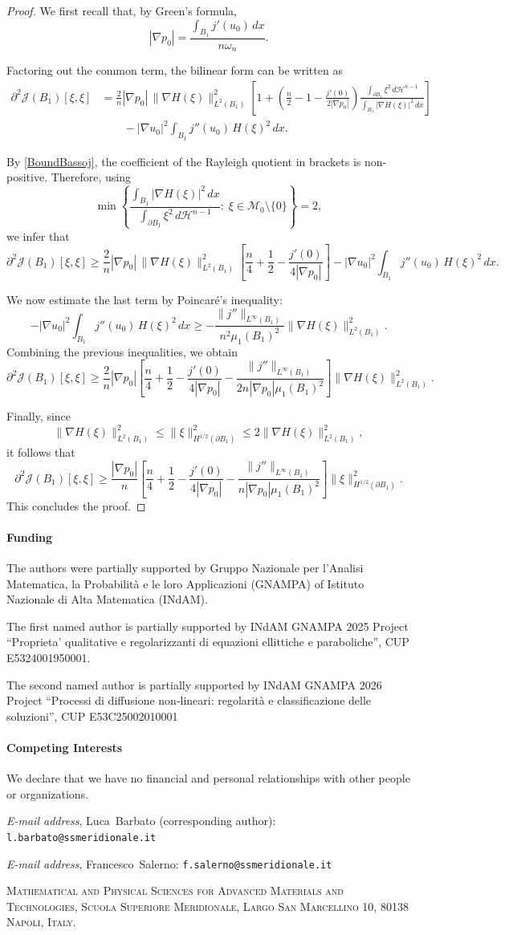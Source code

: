 \documentclass[oneside,a4paper,11pt,notitlepage]{article}
\makeatletter
\theoremstyle{definition}
\theoremstyle{plain}
\theoremstyle{definition}
\newcommand{\Addresses}{{%
\bigskip 
  \footnotesize 
\noindent \textit{E-mail address}, Luca~Barbato (corresponding author): \texttt{l.barbato@ssmeridionale.it} 

     \medskip 

 \noindent \textit{E-mail address}, Francesco~Salerno: \texttt{f.salerno@ssmeridionale.it}

  
   \medskip 
 
  \textsc{Mathematical and Physical Sciences for Advanced Materials and Technologies, Scuola Superiore Meridionale, Largo San Marcellino 10, 80138 Napoli, Italy. } 
 
 
 \par\nopagebreak 

}}
\makeatother
\begin{document}
\begin{proof}
We first recall that, by Green's formula,
\[
|\nabla p_0|=\frac{\int_{B_1} j'(u_0)\,dx}{n\omega_n}.
\]

Factoring out the common term, the bilinear form can be written as
\[
\begin{aligned}
\partial^2\mathcal{J}(B_1)[\xi,\xi]&=\frac{2}{n}|\nabla p_0|\,\|\nabla H(\xi)\|_{L^2(B_1)}^2\left[1+\left(\frac n2-1-\frac{j'(0)}{2|\nabla p_0|}\right)\frac{\int_{\partial B_1}\xi^2\,d\mathcal H^{n-1}}{\int_{B_1}|\nabla H(\xi)|^2\,dx}\right] \\&\qquad-|\nabla u_0|^2\int_{B_1} j''(u_0)\,H(\xi)^2\,dx.
\end{aligned}
\]

By \eqref{BoundBassoj}, the coefficient of the Rayleigh quotient in brackets is non-positive. Therefore, using
\[
\min\left\{\frac{\int_{B_1}|\nabla H(\xi)|^2\,dx}{\int_{\partial B_1}\xi^2\,d\mathcal H^{n-1}}:\;\xi\in\mathcal M_0\setminus\{0\}\right\}=2,
\]
we infer that
\[
\partial^2\mathcal{J}(B_1)[\xi,\xi]\geq\frac{2}{n}|\nabla p_0|\,\|\nabla H(\xi)\|_{L^2(B_1)}^2\left[\frac n4+\frac12-\frac{j'(0)}{4|\nabla p_0|}\right]-|\nabla u_0|^2\int_{B_1} j''(u_0)\,H(\xi)^2\,dx.
\]

We now estimate the last term by Poincar\'e's inequality:
\[
-|\nabla u_0|^2\int_{B_1} j''(u_0)\,H(\xi)^2\,dx\geq-\frac{\|j''\|_{L^\infty(B_1)}}{n^2\mu_1(B_1)^2}\|\nabla H(\xi)\|_{L^2(B_1)}^2.
\]
Combining the previous inequalities, we obtain
\[
\partial^2\mathcal{J}(B_1)[\xi,\xi]\geq\frac{2}{n}|\nabla p_0|\left[\frac n4+\frac12-\frac{j'(0)}{4|\nabla p_0|}-\frac{\|j''\|_{L^\infty(B_1)}}{2n|\nabla p_0|\mu_1(B_1)^2}\right]\|\nabla H(\xi)\|_{L^2(B_1)}^2.
\]

Finally, since
\[
\|\nabla H(\xi)\|_{L^2(B_1)}^2\leq\|\xi\|_{H^{1/2}(\partial B_1)}^2\leq2\|\nabla H(\xi)\|_{L^2(B_1)}^2,
\]
it follows that
\[
\partial^2\mathcal{J}(B_1)[\xi,\xi]\geq\frac{|\nabla p_0|}{n}\left[\frac n4+\frac12-\frac{j'(0)}{4|\nabla p_0|}-\frac{\|j''\|_{L^\infty(B_1)}}{n|\nabla p_0|\mu_1(B_1)^2}\right]\|\xi\|_{H^{1/2}(\partial B_1)}^2.
\]
This concludes the proof.
\end{proof}
\paragraph{Funding}
The authors were partially supported by Gruppo Nazionale per l’Analisi Matematica, la Probabilità e le loro Applicazioni
(GNAMPA) of Istituto Nazionale di Alta Matematica (INdAM).

The first named author is partially supported by INdAM GNAMPA 2025 Project ``Proprieta’ qualitative e regolarizzanti di equazioni ellittiche e paraboliche'', CUP E5324001950001.

The second named author is partially supported by INdAM GNAMPA 2026 Project ``Processi di diffusione non-lineari: regolarità e classificazione delle soluzioni'', CUP E53C25002010001
\paragraph{Competing Interests}
We declare that we have no financial and personal relationships with other people or organizations.


\Addresses
\end{document}
